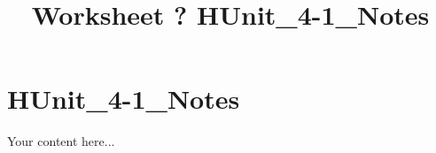 \documentclass{article}
\title{Worksheet ? HUnit_4-1_Notes}
\begin{document}
\maketitle
\section*{HUnit_4-1_Notes}
Your content here...\\
\end{document}
